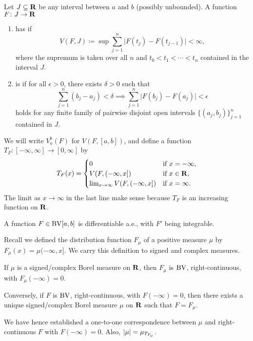\begin{defn}
    Let $J \subseteq \mathbf{R}$ be any interval between $a$ and $b$ (possibly unbounded). A function $F\colon J\to \mathbf{R}$ \begin{enumerate}
        \item has  if \[
            V(F,J) \coloneqq \sup\sum_{j=1}^n\bigl\vert F(t_{j}) - F(t_{j-1})\bigr\vert < \infty,
        \] where the supremum is taken over all $n$ and $t_0 < t_1 < \dotsb < t_n$ contained in the interval $J$.
        \item is  if for all $\epsilon > 0$, there exists $\delta > 0$ such that \[
        \sum_{j=1}^n (b_j - a_j) < \delta \implies \sum_{j=1}^n \bigl\vert{F(b_j) - F(a_j)}\bigr\vert <\epsilon
    \] holds for any finite family of pairwise disjoint open intervals $\{(a_j,b_j)\}_{j=1}^n$ contained in $J$.
    \end{enumerate}


    We will write $V_a^b(F)$ for $V(F,[a,b])$, and define a function $T_F \colon [-\infty,\infty] \to [0,\infty]$ by \[T_F(x) = \begin{cases}
        0 & \text{if }x = -\infty, \\
        V(F,(-\infty,x]) & \text{if }x\in \mathbf{R},\\
        \lim_{x \to \infty} V(F,(-\infty,x]) &  \text{if }x = \infty.
    \end{cases}\]
    The limit as $x \to \infty$ in the last line make sense because $T_F$ is an increasing function on $\mathbf{R}$.

    \begin{thm}
        A function $F \in \operatorname{BV}[a,b]$ is differentiable a.e., with $F'$ being integrable.
    \end{thm}

    Recall we defined the distribution function $F_\mu$ of a positive measure $\mu$ by $F_\mu(x) = \mu(-\infty,x]$. We carry this definition to signed and complex measures.
    \begin{thm}
        If $\mu$ is a signed/complex Borel measure on $\mathbf{R}$, then $F_\mu$ is $\operatorname{BV}$, right-continuous, with $F_\mu(-\infty) = 0$.
        
        Conversely, if $F$ is $\operatorname{BV}$, right-continuous, with $F(-\infty) = 0$, then there exists a unique signed/complex Borel measure $\mu$ on $\mathbf{R}$ such that $F = F_\mu$.
        
         We have hence established a one-to-one correspondence between $\mu$ and right-continuous $F$ with $F(-\infty) = 0$. Also, $\lvert \mu \rvert = \mu_{T_{F_\mu}}$.
    \end{thm}
\end{defn}

